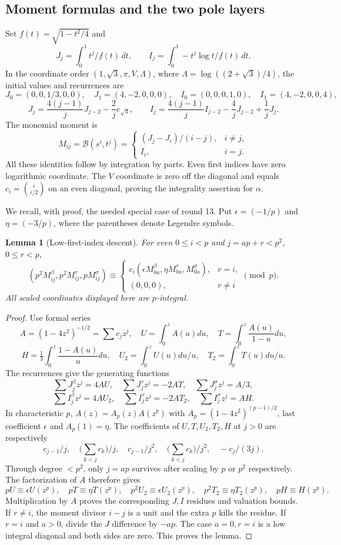 \documentclass[11pt,a4paper]{article}
\numberwithin{equation}{section}
\newtheorem{lemma}[theorem]{Lemma}
\theoremstyle{definition}\newtheorem{definition}[theorem]{Definition}
\theoremstyle{remark}\newtheorem{remark}[theorem]{Remark}
\newcommand{\B}{\mathcal B}\newcommand{\N}{\mathcal N}\newcommand{\M}{\mathcal M}
\begin{document}
\subsection{Moment formulas and the two pole layers}
Set $f(t)=\sqrt{1-t^2/4}$ and
\[
 J_j=\int_0^1t^j/f(t)\,dt,\qquad I_j=\int_0^1-t^j\log t/f(t)\,dt.
\]
In the coordinate order $(1,\sqrt3,\pi,V,\Lambda)$, where $\Lambda=\log((2+\sqrt3)/4)$, the initial values and recurrences are
\[
 J_0=(0,0,1/3,0,0),\quad J_1=(4,-2,0,0,0),\quad
 I_0=(0,0,0,1,0),\quad I_1=(4,-2,0,0,4),
\]
\[
 J_j=\frac{4(j-1)}jJ_{j-2}-\frac2j e_{\sqrt3},\qquad
 I_j=\frac{4(j-1)}jI_{j-2}-\frac4jJ_{j-2}+\frac1jJ_j.
\]
The monomial moment is
\[
 M_{ij}=\B(s^i,t^j)=\begin{cases}(J_j-J_i)/(i-j),&i\ne j,\\I_i,&i=j.\end{cases}
\]
All these identities follow by integration by parts. Even first indices have zero logarithmic coordinate. The $V$ coordinate is zero off the diagonal and equals $c_i=\binom{i}{i/2}$ on an even diagonal, proving the integrality assertion for $\alpha$.

We recall, with proof, the needed special case of round 13. Put $\epsilon=(-1/p)$ and $\eta=(-3/p)$, where the parentheses denote Legendre symbols.
\begin{lemma}[Low-first-index descent]\label{local:descent}
For even $0\le i<p$ and $j=ap+r<p^2$, $0\le r<p$,
\[
 (p^2M_{ij}^{\beta},p^2M_{ij}^{\tau},pM_{ij}^{\sigma})
 \equiv\begin{cases}c_i(\epsilon M_{0a}^{\beta},\eta M_{0a}^{\tau},M_{0a}^{\sigma}),&r=i,\\(0,0,0),&r\ne i\end{cases}\pmod p.
\]
All scaled coordinates displayed here are $p$-integral.
\end{lemma}
\begin{proof}
Use formal series
\[
 A=(1-4z^2)^{-1/2}=\sum c_jz^j,\quad U=\int_0^zA(u)du,\quad
 T=\int_0^z\frac{A(u)}{1-u}du,
\]
\[
 H=\tfrac13\int_0^z\frac{1-A(u)}u du,\quad U_2=\int_0^zU(u)du/u,\quad T_2=\int_0^zT(u)du/u.
\]
The recurrences give the generating functions
\[
 \sum J_j^\beta z^j=4AU,\quad \sum J_j^\tau z^j=-2AT,\quad \sum J_j^\sigma z^j=A/3,
\]
\[
 \sum I_j^\beta z^j=4AU_2,\quad\sum I_j^\tau z^j=-2AT_2,\quad\sum I_j^\sigma z^j=AH.
\]
In characteristic $p$, $A(z)=A_p(z)A(z^p)$ with $A_p=(1-4z^2)^{(p-1)/2}$, last coefficient $\epsilon$ and $A_p(1)=\eta$. The coefficients of $U,T,U_2,T_2,H$ at $j>0$ are respectively
\[
 c_{j-1}/j,\quad \Big(\sum_{k<j}c_k\Big)/j,\quad c_{j-1}/j^2,\quad
 \Big(\sum_{k<j}c_k\Big)/j^2,\quad-c_j/(3j).
\]
Through degree $<p^2$, only $j=ap$ survives after scaling by $p$ or $p^2$ respectively. The factorization of $A$ therefore gives
\[
 pU\equiv\epsilon U(z^p),\quad pT\equiv\eta T(z^p),\quad
 p^2U_2\equiv\epsilon U_2(z^p),\quad p^2T_2\equiv\eta T_2(z^p),\quad pH\equiv H(z^p).
\]
Multiplication by $A$ proves the corresponding $J,I$ residues and valuation bounds. If $r\ne i$, the moment divisor $i-j$ is a unit and the extra $p$ kills the residue. If $r=i$ and $a>0$, divide the $J$ difference by $-ap$. The case $a=0,r=i$ is a low integral diagonal and both sides are zero. This proves the lemma.
\end{proof}
\end{document}
